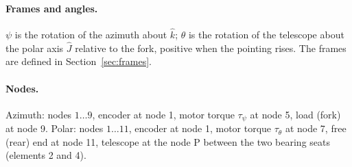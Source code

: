 \documentclass[10pt,a4paper]{article}
\numberwithin{equation}{section}
\begin{document}
\paragraph{Frames and angles.} $\psi$ is the rotation of the azimuth about $\hat k$; $\theta$ is the rotation of the telescope about the polar axis $\hat J$ relative to the fork, positive when the pointing rises. The frames are defined in Section~\ref{sec:frames}.
\paragraph{Nodes.} Azimuth: nodes $1\dots9$, encoder at node 1, motor torque $\tau_\psi$ at node 5, load (fork) at node 9. Polar: nodes $1\dots11$, encoder at node 1, motor torque $\tau_\theta$ at node 7, free (rear) end at node 11, telescope at the node P between the two bearing seats (elements 2 and 4).
\end{document}
